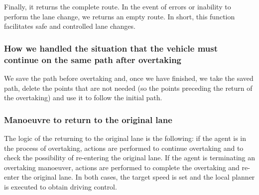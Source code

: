 \documentclass{article}
\begin{document}
Finally, it returns the complete route. In the event of errors or inability to
perform the lane change, we returns an empty route. In short, this function facilitates safe and
controlled lane changes.

\subsubsection*{How we handled the situation that the vehicle must continue on the same path after overtaking}
We save the path before overtaking and, once we have finished, we take the saved path,
delete the points that are not needed (so the points preceding the return of the overtaking) and use it
to follow the initial path.

\subsubsection*{Manoeuvre to return to the original lane}
The logic of the returning to the original lane is the following:
if the agent is in the process of overtaking, actions are performed to continue
overtaking and to check the possibility of re-entering the original lane.
If the agent is terminating an overtaking manoeuver, actions are performed to complete the overtaking and
re-enter the original lane.
In both cases, the target speed is set and the local planner is executed to obtain driving control.
\end{document}
